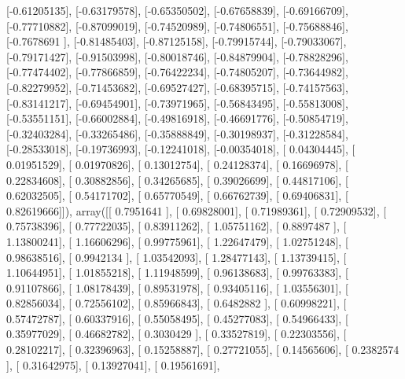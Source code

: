 \documentclass{article}
\begin{document}
       [-0.61205135],
       [-0.63179578],
       [-0.65350502],
       [-0.67658839],
       [-0.69166709],
       [-0.77710882],
       [-0.87099019],
       [-0.74520989],
       [-0.74806551],
       [-0.75688846],
       [-0.7678691 ],
       [-0.81485403],
       [-0.87125158],
       [-0.79915744],
       [-0.79033067],
       [-0.79171427],
       [-0.91503998],
       [-0.80018746],
       [-0.84879904],
       [-0.78828296],
       [-0.77474402],
       [-0.77866859],
       [-0.76422234],
       [-0.74805207],
       [-0.73644982],
       [-0.82279952],
       [-0.71453682],
       [-0.69527427],
       [-0.68395715],
       [-0.74157563],
       [-0.83141217],
       [-0.69454901],
       [-0.73971965],
       [-0.56843495],
       [-0.55813008],
       [-0.53551151],
       [-0.66002884],
       [-0.49816918],
       [-0.46691776],
       [-0.50854719],
       [-0.32403284],
       [-0.33265486],
       [-0.35888849],
       [-0.30198937],
       [-0.31228584],
       [-0.28533018],
       [-0.19736993],
       [-0.12241018],
       [-0.00354018],
       [ 0.04304445],
       [ 0.01951529],
       [ 0.01970826],
       [ 0.13012754],
       [ 0.24128374],
       [ 0.16696978],
       [ 0.22834608],
       [ 0.30882856],
       [ 0.34265685],
       [ 0.39026699],
       [ 0.44817106],
       [ 0.62032505],
       [ 0.54171702],
       [ 0.65770549],
       [ 0.66762739],
       [ 0.69406831],
       [ 0.82619666]]), array([[ 0.7951641 ],
       [ 0.69828001],
       [ 0.71989361],
       [ 0.72909532],
       [ 0.75738396],
       [ 0.77722035],
       [ 0.83911262],
       [ 1.05751162],
       [ 0.8897487 ],
       [ 1.13800241],
       [ 1.16606296],
       [ 0.99775961],
       [ 1.22647479],
       [ 1.02751248],
       [ 0.98638516],
       [ 0.9942134 ],
       [ 1.03542093],
       [ 1.28477143],
       [ 1.13739415],
       [ 1.10644951],
       [ 1.01855218],
       [ 1.11948599],
       [ 0.96138683],
       [ 0.99763383],
       [ 0.91107866],
       [ 1.08178439],
       [ 0.89531978],
       [ 0.93405116],
       [ 1.03556301],
       [ 0.82856034],
       [ 0.72556102],
       [ 0.85966843],
       [ 0.6482882 ],
       [ 0.60998221],
       [ 0.57472787],
       [ 0.60337916],
       [ 0.55058495],
       [ 0.45277083],
       [ 0.54966433],
       [ 0.35977029],
       [ 0.46682782],
       [ 0.3030429 ],
       [ 0.33527819],
       [ 0.22303556],
       [ 0.28102217],
       [ 0.32396963],
       [ 0.15258887],
       [ 0.27721055],
       [ 0.14565606],
       [ 0.2382574 ],
       [ 0.31642975],
       [ 0.13927041],
       [ 0.19561691],
\end{document}
